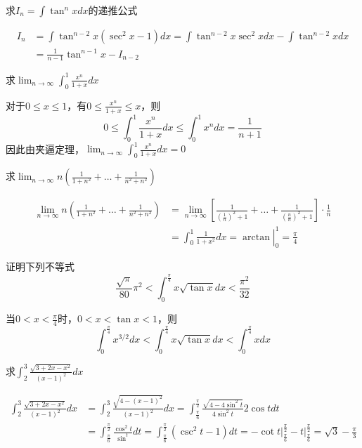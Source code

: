\documentclass{article}
\begin{document}
\begin{examplle}[]
求\(I_n=\int\tan^nxdx\)的递推公式

\begin{align*}
I_n&=\int\tan^{n-2}x(\sec^2x-1)dx=\int\tan^{n-2}x\sec^2 xdx-\int\tan^{n-2}xdx\\
&=\frac{1}{n-1}\tan^{n-1}x-I_{n-2}
\end{align*}
\end{examplle}

\begin{examplle}[]
求\(\displaystyle\lim_{n\to\infty}\int_0^1\frac{x^n}{1+x}dx\)

对于\(0\le x\le1\)，有\(0\le\frac{x^n}{1+x}\le x\)，则
\begin{equation*}
0\le\int_0^1\frac{x^n}{1+x}dx\le\int^1_0x^ndx=\frac{1}{n+1}
\end{equation*}
因此由夹逼定理，\(\displaystyle\lim_{n\to\infty}\int_0^1\frac{x^n}{1+x}dx=0\)
\end{examplle}

\begin{examplle}[]
求\(\displaystyle\lim_{n\to\infty}n(\frac{1}{1+n^2}+\dots+\frac{1}{n^2+n^2})\)

\begin{align*}
\lim_{n\to\infty}n(\frac{1}{1+n^2}+\dots+\frac{1}{n^2+n^2})&=
\lim_{n\to\infty}\left[
\frac{1}{(\frac{1}{n})^2+1}+\dots+\frac{1}{(\frac{n}{n})^2+1}
\right]\cdot\frac{1}{n}\\
&=\left.\int_0^1\frac{1}{1+x^2}dx=\arctan\right\rvert_0^1=\frac{\pi}{4}
\end{align*}
\end{examplle}

\begin{examplle}[]
证明下列不等式
\begin{equation*}
\frac{\sqrt{\pi}}{80}\pi^2<\int_0^{\frac{\pi}{4}}x\sqrt{\tan x}dx<
\frac{\pi^2}{32}
\end{equation*}

当\(0<x<\frac{\pi}{4}\)时，\(0<x<\tan x<1\)，则
\begin{equation*}
\int_0^{\frac{\pi}{4}}x^{3/2}dx<\int_0^{\frac{\pi}{4}}x\sqrt{\tan x}dx
<\int^{\frac{\pi}{4}}_0xdx
\end{equation*}
\end{examplle}

\begin{examplle}[]
求\(\displaystyle\int_2^3\frac{\sqrt{3+2x-x^2}}{(x-1)^2}dx\)

\begin{align*}
\int_2^3\frac{\sqrt{3+2x-x^2}}{(x-1)^2}dx&=
\int_2^3\frac{\sqrt{4-(x-1)^2}}{(x-1)^2}dx=
\int^{\frac{\pi}{2}}_{\frac{\pi}{6}}\frac{\sqrt{4-4\sin^2t}}{4\sin^2t}2\cos tdt\\
&=\int^{\frac{\pi}{2}}_{\frac{\pi}{6}}\frac{\cos^2t}{\sin^t}dt=
\int^{\frac{\pi}{2}}_{\frac{\pi}{6}}(\csc^2t-1)dt=-\cot t\rvert^{\frac{\pi}{2}}_{\frac{\pi}{6}}
-t\rvert^{\frac{\pi}{2}}_{\frac{\pi}{6}}=\sqrt{3}-\frac{\pi}{3}
\end{align*}
\end{examplle}
\end{document}
